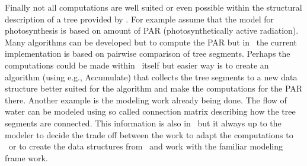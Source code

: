 Finally  not all computations are well  suited or even possible within
the structural description of a  tree provided by \lignum. For example
assume that  the model  for photosynthesis is  based  on amount of PAR
(photosynthetically   active  radiation).     Many   algorithms can be
developed but to compute   the   PAR  but  in \lignum\  the    current
implementation   is based on   pairwise  comparison of tree  segments.
Perhaps  the  computations could  be  made within  \lignum\ itself but
easier way  is to create  an algorithm  (using  e.g., Accumulate) that
collects the tree  segments to a  new data structure better suited for
the algorithm and  make the computations  for the PAR there.   Another
example is the modeling work already being done. The flow of water can
be modeled  using so called  connection matrix describing how the tree
segments  are connected. This information  is  also in \lignum\ but it
always up to the  modeler to decide the  trade off between the work to
adapt the  computations to \lignum\ or  to create the  data structures
from \lignum\ and work with the familiar modeling frame work.
